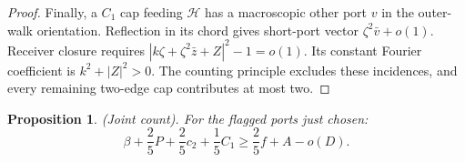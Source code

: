 \documentclass[10pt,reqno]{amsart}
\newtheorem{proposition}{Proposition}[section]
\begin{document}
\begin{proof}
    Finally, a $C_1$ cap feeding $\mathcal{H}$ has a macroscopic other port $v$ in the outer-walk orientation. Reflection in its chord gives short-port vector $\zeta^2 \bar{v} + o(1)$. Receiver closure requires $|k \zeta + \zeta^2 \bar{z} + Z|^2 - 1 = o(1)$. Its constant Fourier coefficient is $k^2 + |Z|^2 > 0$. The counting principle excludes these incidences, and every remaining two-edge cap contributes at most two.
\end{proof}



\begin{proposition}
    (Joint count). For the flagged ports just chosen:
    \begin{equation}
        \beta + \frac{2}{5}P + \frac{2}{5} c_2 + \frac{1}{5}C_1 \ge \frac{2}{5} f + A - o(D).
    \end{equation}
\end{proposition}
\end{document}
